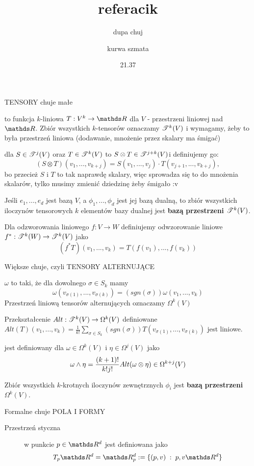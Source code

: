 \documentclass{article}
\title{referacik}
\author{dupa chuj \and kurwa szmata}
\date{21.37}
\newcommand{\T}{\rodz{T}}
\begin{document}
\maketitle
\thispagestyle{empty}

{\large\color{def}TENSORY} chuje małe
\begin{description}
    \item [$k$-tensor] to funkcja $k$-liniowa $T:V^k\to\R$ dla $V$ - przestrzeni liniowej nad $\R$. Zbiór wszystkich $k$-tensorów oznaczamy $\mathcal{T}^k(V)$ i wymagamy, żeby to była przestrzeń liniowa (dodawanie, mnożenie przez skalary ma śmigać)
    \item [Iloczyn tensorowy] dla $S\in\T^j(V)$ oraz $T\in\T^k(V)$ to $S\otimes T\in\T^{j+k}(V)$i definiujemy go: $$(S\otimes T)(v_1,...,v_{k+j})=S(v_1,...,v_j)\cdot T(v_{j+1},...,v_{k+j}),$$ bo przecież $S$ i $T$ to tak naprawdę skalary, więc sprowadza się to do mnożenia skalarów, tylko musimy zmienić dziedzinę żeby śmigało :v
    \item Jeśli $e_1,...,e_d$ jest bazą $V$, a $\phi_1,...,\phi_d$ jest jej bazą dualną, to zbiór wszystkich iloczynów tensorowych $k$ elementów bazy dualnej jest \textbf{bazą przestrzeni $\T^k(V)$}.
    \item Dla odzworowania liniowego $f:V\to W$ definiujemy odwzorowanie liniowe $f^*:\T^k(W)\to\T^k(V)$ jako $$(f^*T)(v_1,...,v_k)=T(f(v_1),...,f(v_k))$$
\end{description}
\medskip

Większe chuje, czyli {\large\color{def}TENSORY ALTERNUJĄCE}
\begin{description}
    \item [Tensor alternujący] $\omega$ to taki, że dla dowolnego $\sigma\in S_k$ mamy $$\omega(v_{\sigma(1)},...,v_{\sigma(k)})=(sgn(\sigma))\omega(v_1,...,v_k)$$ Przestrzeń liniową tensorów alternujących oznaczamy $\Omega^k(V)$
    \item Przekształcenie $Alt:\T^k(V)\to\Omega^k(V)$ definiowane $Alt(T)(v_1,...,v_k)=\frac1{k!}\sum_{\sigma\in S_k}(sgn(\sigma))T(v_{\sigma(1)},...,v_{\sigma(k)})$ jest liniowe.
    \item [Iloczyn zewnętrzny tensorów alternujących] jest definiowany dla $\omega\in\Omega^k(V)$ i $\eta\in\Omega^j(V)$ jako $$\omega\land\eta={(k+1)!\over k!j!}Alt(\omega\otimes\eta)\in\Omega^{k+j}(V)$$
    \item Zbiór wszystkich $k$-krotnych iloczynów zewnętrznych $\phi_i$ jest \textbf{bazą przestrzeni} $\Omega^k(V)$.
\end{description}

Formalne chuje {\large\color{def}POLA I FORMY}
\begin{description}
    \item[Przestrzeń styczna] w punkcie $p\in\R^d$ jest definiowana jako $$T_p\R^d=\R^d_p:=\{(p,v)\;:\;p,v\R^d\}$$ 
\end{description}
\end{document}
